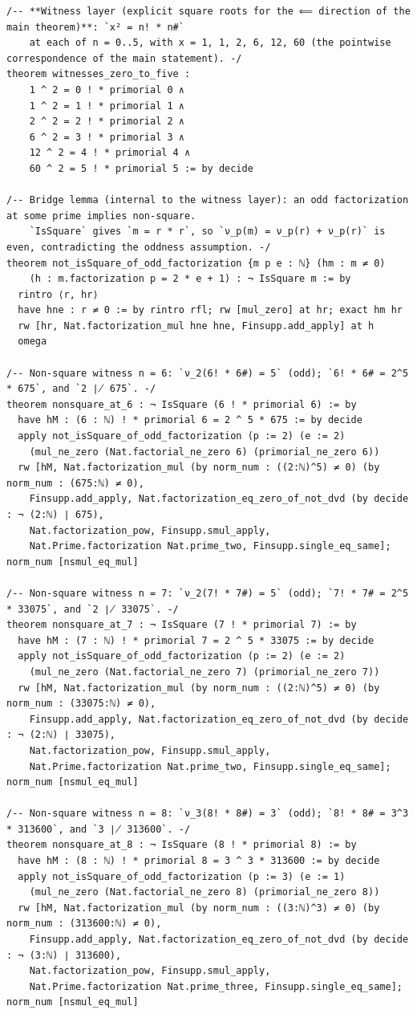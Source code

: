 \documentclass[11pt]{article}
\theoremstyle{definition}
\begin{document}
\begin{lstlisting}
/-- **Witness layer (explicit square roots for the ⟸ direction of the main theorem)**: `x² = n! * n#`
    at each of n = 0..5, with x = 1, 1, 2, 6, 12, 60 (the pointwise correspondence of the main statement). -/
theorem witnesses_zero_to_five :
    1 ^ 2 = 0 ! * primorial 0 ∧
    1 ^ 2 = 1 ! * primorial 1 ∧
    2 ^ 2 = 2 ! * primorial 2 ∧
    6 ^ 2 = 3 ! * primorial 3 ∧
    12 ^ 2 = 4 ! * primorial 4 ∧
    60 ^ 2 = 5 ! * primorial 5 := by decide

/-- Bridge lemma (internal to the witness layer): an odd factorization at some prime implies non-square.
    `IsSquare` gives `m = r * r`, so `ν_p(m) = ν_p(r) + ν_p(r)` is even, contradicting the oddness assumption. -/
theorem not_isSquare_of_odd_factorization {m p e : ℕ} (hm : m ≠ 0)
    (h : m.factorization p = 2 * e + 1) : ¬ IsSquare m := by
  rintro ⟨r, hr⟩
  have hne : r ≠ 0 := by rintro rfl; rw [mul_zero] at hr; exact hm hr
  rw [hr, Nat.factorization_mul hne hne, Finsupp.add_apply] at h
  omega

/-- Non-square witness n = 6: `ν_2(6! * 6#) = 5` (odd); `6! * 6# = 2^5 * 675`, and `2 ∤ 675`. -/
theorem nonsquare_at_6 : ¬ IsSquare (6 ! * primorial 6) := by
  have hM : (6 : ℕ) ! * primorial 6 = 2 ^ 5 * 675 := by decide
  apply not_isSquare_of_odd_factorization (p := 2) (e := 2)
    (mul_ne_zero (Nat.factorial_ne_zero 6) (primorial_ne_zero 6))
  rw [hM, Nat.factorization_mul (by norm_num : ((2:ℕ)^5) ≠ 0) (by norm_num : (675:ℕ) ≠ 0),
    Finsupp.add_apply, Nat.factorization_eq_zero_of_not_dvd (by decide : ¬ (2:ℕ) ∣ 675),
    Nat.factorization_pow, Finsupp.smul_apply,
    Nat.Prime.factorization Nat.prime_two, Finsupp.single_eq_same]; norm_num [nsmul_eq_mul]

/-- Non-square witness n = 7: `ν_2(7! * 7#) = 5` (odd); `7! * 7# = 2^5 * 33075`, and `2 ∤ 33075`. -/
theorem nonsquare_at_7 : ¬ IsSquare (7 ! * primorial 7) := by
  have hM : (7 : ℕ) ! * primorial 7 = 2 ^ 5 * 33075 := by decide
  apply not_isSquare_of_odd_factorization (p := 2) (e := 2)
    (mul_ne_zero (Nat.factorial_ne_zero 7) (primorial_ne_zero 7))
  rw [hM, Nat.factorization_mul (by norm_num : ((2:ℕ)^5) ≠ 0) (by norm_num : (33075:ℕ) ≠ 0),
    Finsupp.add_apply, Nat.factorization_eq_zero_of_not_dvd (by decide : ¬ (2:ℕ) ∣ 33075),
    Nat.factorization_pow, Finsupp.smul_apply,
    Nat.Prime.factorization Nat.prime_two, Finsupp.single_eq_same]; norm_num [nsmul_eq_mul]

/-- Non-square witness n = 8: `ν_3(8! * 8#) = 3` (odd); `8! * 8# = 3^3 * 313600`, and `3 ∤ 313600`. -/
theorem nonsquare_at_8 : ¬ IsSquare (8 ! * primorial 8) := by
  have hM : (8 : ℕ) ! * primorial 8 = 3 ^ 3 * 313600 := by decide
  apply not_isSquare_of_odd_factorization (p := 3) (e := 1)
    (mul_ne_zero (Nat.factorial_ne_zero 8) (primorial_ne_zero 8))
  rw [hM, Nat.factorization_mul (by norm_num : ((3:ℕ)^3) ≠ 0) (by norm_num : (313600:ℕ) ≠ 0),
    Finsupp.add_apply, Nat.factorization_eq_zero_of_not_dvd (by decide : ¬ (3:ℕ) ∣ 313600),
    Nat.factorization_pow, Finsupp.smul_apply,
    Nat.Prime.factorization Nat.prime_three, Finsupp.single_eq_same]; norm_num [nsmul_eq_mul]


\end{lstlisting}
\end{document}
